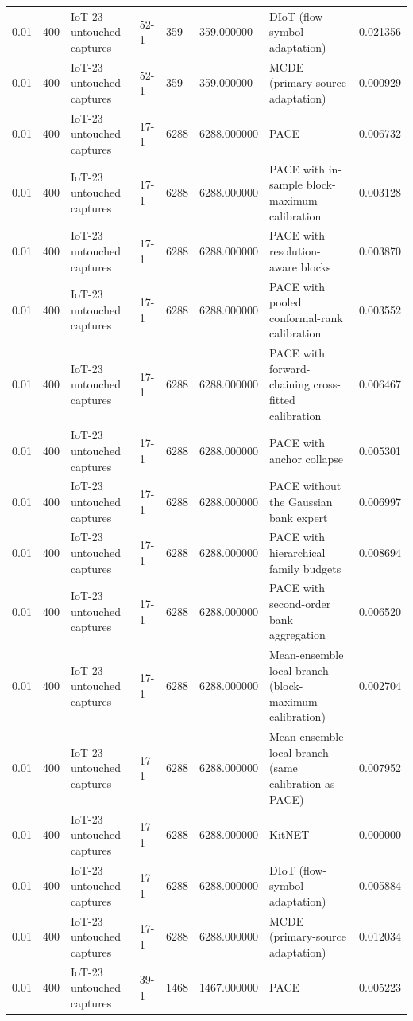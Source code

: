 \begin{tabular}{llllllll}
0.01 & 400 & IoT-23 untouched captures & 52-1 & 359 & 359.000000 & DIoT (flow-symbol adaptation) & 0.021356 \\
0.01 & 400 & IoT-23 untouched captures & 52-1 & 359 & 359.000000 & MCDE (primary-source adaptation) & 0.000929 \\
0.01 & 400 & IoT-23 untouched captures & 17-1 & 6288 & 6288.000000 & PACE & 0.006732 \\
0.01 & 400 & IoT-23 untouched captures & 17-1 & 6288 & 6288.000000 & PACE with in-sample block-maximum calibration & 0.003128 \\
0.01 & 400 & IoT-23 untouched captures & 17-1 & 6288 & 6288.000000 & PACE with resolution-aware blocks & 0.003870 \\
0.01 & 400 & IoT-23 untouched captures & 17-1 & 6288 & 6288.000000 & PACE with pooled conformal-rank calibration & 0.003552 \\
0.01 & 400 & IoT-23 untouched captures & 17-1 & 6288 & 6288.000000 & PACE with forward-chaining cross-fitted calibration & 0.006467 \\
0.01 & 400 & IoT-23 untouched captures & 17-1 & 6288 & 6288.000000 & PACE with anchor collapse & 0.005301 \\
0.01 & 400 & IoT-23 untouched captures & 17-1 & 6288 & 6288.000000 & PACE without the Gaussian bank expert & 0.006997 \\
0.01 & 400 & IoT-23 untouched captures & 17-1 & 6288 & 6288.000000 & PACE with hierarchical family budgets & 0.008694 \\
0.01 & 400 & IoT-23 untouched captures & 17-1 & 6288 & 6288.000000 & PACE with second-order bank aggregation & 0.006520 \\
0.01 & 400 & IoT-23 untouched captures & 17-1 & 6288 & 6288.000000 & Mean-ensemble local branch (block-maximum calibration) & 0.002704 \\
0.01 & 400 & IoT-23 untouched captures & 17-1 & 6288 & 6288.000000 & Mean-ensemble local branch (same calibration as PACE) & 0.007952 \\
0.01 & 400 & IoT-23 untouched captures & 17-1 & 6288 & 6288.000000 & KitNET & 0.000000 \\
0.01 & 400 & IoT-23 untouched captures & 17-1 & 6288 & 6288.000000 & DIoT (flow-symbol adaptation) & 0.005884 \\
0.01 & 400 & IoT-23 untouched captures & 17-1 & 6288 & 6288.000000 & MCDE (primary-source adaptation) & 0.012034 \\
0.01 & 400 & IoT-23 untouched captures & 39-1 & 1468 & 1467.000000 & PACE & 0.005223 \\

\end{tabular}
